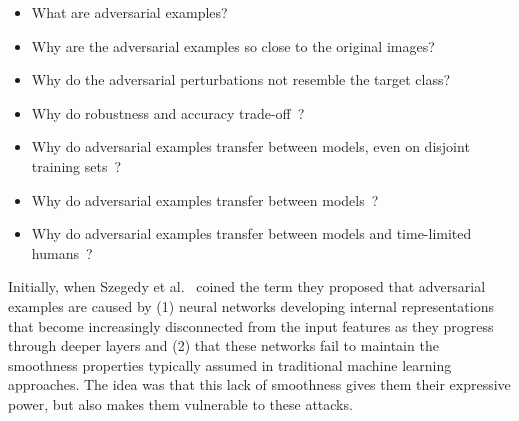 \documentclass[a4paper, oneside]{discothesis}
\begin{document}
\begin{itemize}
	\setlength\itemsep{0em}
	\item What are adversarial examples?
	\item Why are the adversarial examples so close to the original images?
	\item Why do the adversarial perturbations not resemble the target class?
	\item Why do robustness and accuracy trade-off~\cite{zhang2019theoretically}?
	\item Why do adversarial examples transfer between models, even on disjoint training sets~\cite{szegedy2013intriguing}?
	\item Why do adversarial examples transfer between models~\cite{szegedy2013intriguing}?
	\item Why do adversarial examples transfer between models and time-limited humans~\cite{elsayed2018adversarial}?
\end{itemize}

Initially, when Szegedy et al.\ \cite{szegedy2013intriguing} coined the term they proposed that adversarial examples are caused by (1) neural networks developing internal representations that become increasingly disconnected from the input features as they progress through deeper layers and (2) that these networks fail to maintain the smoothness properties typically assumed in traditional machine learning approaches. The idea was that this lack of smoothness gives them their expressive power, but also makes them vulnerable to these attacks.
\end{document}
